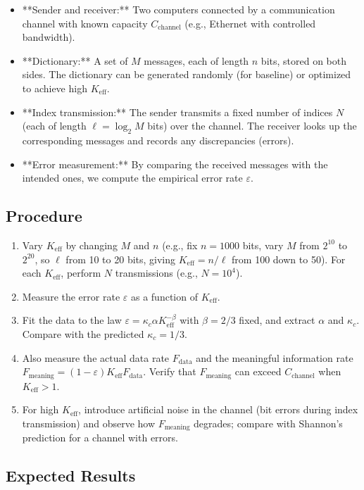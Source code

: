 \documentclass[12pt,a4paper]{article}
\theoremstyle{remark}
\newcommand{\Keff}{K_{\mathrm{eff}}}
\begin{document}
	\begin{itemize}
		\item **Sender and receiver:** Two computers connected by a communication channel with known capacity $C_{\text{channel}}$ (e.g., Ethernet with controlled bandwidth).
		\item **Dictionary:** A set of $M$ messages, each of length $n$ bits, stored on both sides. The dictionary can be generated randomly (for baseline) or optimized to achieve high $\Keff$.
		\item **Index transmission:** The sender transmits a fixed number of indices $N$ (each of length $\ell = \log_2 M$ bits) over the channel. The receiver looks up the corresponding messages and records any discrepancies (errors).
		\item **Error measurement:** By comparing the received messages with the intended ones, we compute the empirical error rate $\varepsilon$.
	\end{itemize}
	
	\subsection{Procedure}
	
	\begin{enumerate}
		\item Vary $\Keff$ by changing $M$ and $n$ (e.g., fix $n=1000$ bits, vary $M$ from $2^{10}$ to $2^{20}$, so $\ell$ from 10 to 20 bits, giving $\Keff = n/\ell$ from 100 down to 50). For each $\Keff$, perform $N$ transmissions (e.g., $N=10^4$).
		\item Measure the error rate $\varepsilon$ as a function of $\Keff$.
		\item Fit the data to the law $\varepsilon = \kappa_c \alpha K_{\mathrm{eff}}^{-\beta}$ with $\beta=2/3$ fixed, and extract $\alpha$ and $\kappa_c$. Compare with the predicted $\kappa_c=1/3$.
		\item Also measure the actual data rate $F_{\text{data}}$ and the meaningful information rate $F_{\text{meaning}} = (1-\varepsilon) \Keff F_{\text{data}}$. Verify that $F_{\text{meaning}}$ can exceed $C_{\text{channel}}$ when $\Keff>1$.
		\item For high $\Keff$, introduce artificial noise in the channel (bit errors during index transmission) and observe how $F_{\text{meaning}}$ degrades; compare with Shannon's prediction for a channel with errors.
	\end{enumerate}
	
	\subsection{Expected Results}
	
\end{document}
